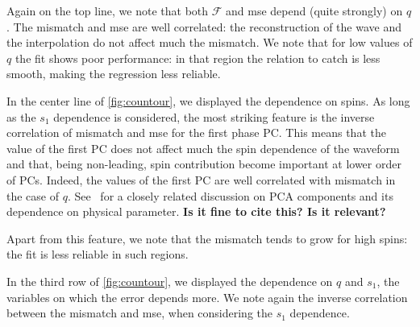 \par
Again on the top line, we note that both $\mathcal{F}$ and mse depend (quite strongly) on $q$.
The mismatch and mse are well correlated: the reconstruction of the wave and the interpolation do not affect much the mismatch.
We note that for low values of $q$ the fit shows poor performance: in that region the relation to catch is less smooth, making the regression less reliable.
\par
In the center line of \ref{fig:countour}, we displayed the dependence on spins.
As long as the $s_1$ dependence is considered, the most striking feature is the inverse correlation of mismatch and mse for the first phase PC.
This means that the value of the first PC does not affect much the spin dependence of the waveform and that, being non-leading, spin contribution become important at lower order of PCs.
Indeed, the values of the first PC are well correlated with mismatch in the case of $q$. See~\cite{Ohme2013PCA_GW} for a closely related discussion on PCA components and its dependence on physical parameter.
\textbf{Is it fine to cite this? Is it relevant?}
\par
Apart from this feature, we note that the mismatch tends to grow for high spins: the fit is less reliable in such regions.
\par
In the third row of \ref{fig:countour}, we displayed the dependence on $q$ and $s_1$, the variables on which the error depends more.
We note again the inverse correlation between the mismatch and mse, when considering the $s_1$ dependence.
